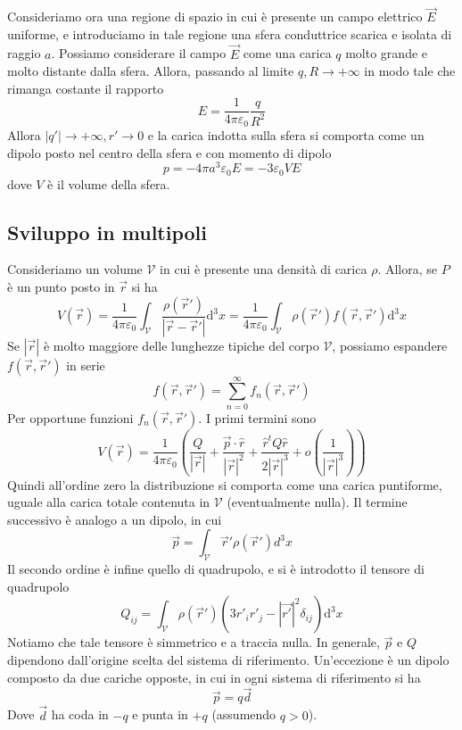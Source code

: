 \documentclass[a4paper,11pt]{book}
\newcommand{\dif}{\mathrm{d}}
\let\oldepsilon\epsilon
\let\oldvarepsilon\varepsilon
\renewcommand{\epsilon}{\oldvarepsilon}
\renewcommand{\varepsilon}{\oldepsilon}
\newcommand{\V}{\mathcal{V}}
\theoremstyle{definition}
\theoremstyle{theorem}
\begin{document}
Consideriamo ora una regione di spazio in cui è presente un campo elettrico $\vec{E}$ uniforme, e introduciamo in tale regione una sfera conduttrice scarica e isolata di raggio $a$. Possiamo considerare il campo $\vec{E}$ come una carica $q$ molto grande e molto distante dalla sfera. Allora, passando al limite $q,R\to+\infty$ in modo tale che rimanga costante il rapporto
\[E=\frac{1}{4\pi\epsilon_0}\frac{q}{R^2}\]
Allora $|q'|\to+\infty,r'\to0$ e la carica indotta sulla sfera si comporta come un dipolo posto nel centro della sfera e con momento di dipolo
\[p=-4\pi a^3\epsilon_0E=-3\epsilon_0VE\]
dove $V$ è il volume della sfera.
\subsection{Sviluppo in multipoli}
Consideriamo un volume $\V$ in cui è presente una densità di carica $\rho$. Allora, se $P$ è un punto posto in $\vec{r}$ si ha
\[V(\vec{r})=\frac{1}{4\pi\epsilon_0}\int_{\V}\frac{\rho(\vec{r}')}{|\vec{r}-\vec{r}'|}\dif^3x=\frac{1}{4\pi\epsilon_0}\int_{\V}\rho(\vec{r}')f(\vec{r},\vec{r}')\dif^3x\]
Se $|\vec{r}|$ è molto maggiore delle lunghezze tipiche del corpo $\V$, possiamo espandere $f(\vec{r},\vec{r}')$ in serie
\[f(\vec{r},\vec{r}')=\sum_{n=0}^{\infty}f_n(\vec{r},\vec{r}')\]
Per opportune funzioni $f_n(\vec{r},\vec{r}')$. I primi termini sono
\[V(\vec{r})=\frac{1}{4\pi\epsilon_0}\left(\frac{Q}{|\vec{r}|}+\frac{\vec{p}\cdot\hat{r}}{|\vec{r}|^2}+\frac{\hat{r}^tQ\hat{r}}{2|\vec{r}|^3}+o\left(\frac{1}{|\vec{r}|^3}\right)\right)\]
Quindi all'ordine zero la distribuzione si comporta come una carica puntiforme, uguale alla carica totale contenuta in $\V$ (eventualmente nulla). Il termine successivo è analogo a un dipolo, in cui
\[\vec{p}=\int_{\V}\vec{r}'\rho(\vec{r}')d^3x\]
Il secondo ordine è infine quello di quadrupolo, e si è introdotto il tensore di quadrupolo
\[Q_{ij}=\int_{\V}\rho(\vec{r}')\left(3r'_ir'_j-|\vec{r'}|^2\delta_{ij}\right)\dif^3x\]
Notiamo che tale tensore è simmetrico e a traccia nulla. In generale, $\vec{p}$ e $Q$ dipendono dall'origine scelta del sistema di riferimento. Un'eccezione è un dipolo composto da due cariche opposte, in cui in ogni sistema di riferimento si ha
\[\vec{p}=q\vec{d}\]
Dove $\vec{d}$ ha coda in $-q$ e punta in $+q$ (assumendo $q>0$).
\end{document}
